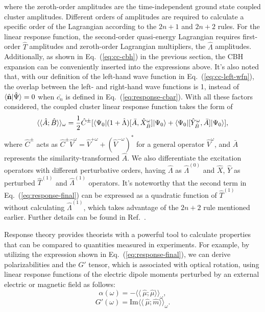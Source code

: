 where the zeroth-order amplitudes are the time-independent ground state coupled cluster amplitudes. Different orders of amplitudes are required to calculate a specific order of the Lagrangian according to the $2n+1$ and $2n+2$ rules.\cite{Kvasnivcka1980, Shavitt2009} For the linear response function, the second-order quasi-energy Lagrangian requires first-order $\hat{T}$ amplitudes and zeroth-order Lagrangian multipliers, the $\hat{\Lambda}$ amplitudes. Additionally, as shown in Eq.~(\ref{eq:cc-cbh}) in the previous section, the CBH expansion can be conveniently inserted into the expressions above. It's also noted that, with our definition of the left-hand wave function in Eq.~(\ref{eq:cc-left-wfn}), the overlap between the left- and right-hand wave functions is 1, instead of $\langle\hat{\textbf{n}} |\hat{\Psi}\rangle=0$ when $\bar{c_{n}}$ is defined in Eq.~(\ref{eq:response-cbar}). With all these factors considered, the coupled cluster linear response function takes the form of
\begin{equation}
\langle\langle \hat{A}; \hat{B}\rangle\rangle_{\omega} = 
\frac{1}{2}\hat{C}^{\pm}[\langle\Psi_{0} |(1+\hat{\Lambda})[\bar{A},\hat{X}_{\hat{B}}^{\omega}]| \Psi_{0} \rangle +
\langle\Psi_{0} |[\hat{Y}_{\hat{B}}^{\omega},\bar{A}]| \Psi_{0} \rangle],
\label{eq:response-final}
\end{equation}
where $\hat{C}^{\pm}$ acts as $\hat{C}^{\pm}\hat{V}^{\omega}=\hat{V}^{+\omega}+(\hat{V}^{-\omega})^{*}$ for a general operator $\hat{V}^{\omega}$, and $\bar{A}$ represents the similarity-transformed $\hat{A}$. We also differentiate the excitation operators with different perturbative orders, having $\hat{\Lambda}$ as $\hat{\Lambda}^{(0)}$ and $\hat{X}$, $\hat{Y}$ as perturbed $\hat{T}^{(1)}$ and $\hat{\Lambda}^{(1)}$ operators. It's noteworthy that the second term in Eq.~(\ref{eq:response-final}) can be expressed as a quadratic function of $\hat{T}^{(1)}$ without calculating $\hat{\Lambda}^{(1)}$, which takes advantage of the $2n+2$ rule mentioned earlier. Further details can be found in Ref.~.

Response theory provides theorists with a powerful tool to calculate properties that can be compared to quantities measured in experiments. For example, by utilizing the expression shown in Eq.~(\ref{eq:response-final}), we can derive polarizabilities and the $G'$ tensor, which is associated with optical rotation, using linear response functions of the electric dipole moments perturbed by an external electric or magnetic field\cite{Crawford2006} as follows:
\begin{equation}
\alpha(\omega) = -\langle\langle\ \hat{\mu};\hat{\mu}\rangle\rangle_{\omega},
\end{equation}
\begin{equation}
G'(\omega) = \textrm{Im}\langle\langle\ \hat{\mu};\hat{m}\rangle\rangle_{\omega}.
\end{equation}


